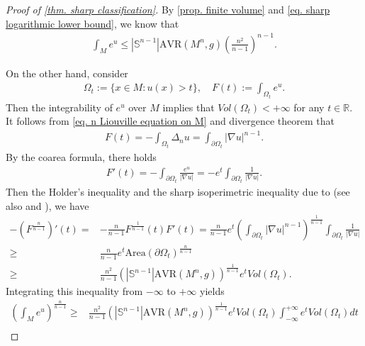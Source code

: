 \documentclass[12pt]{amsart}
\theoremstyle{plain}
\theoremstyle{definition}
\theoremstyle{remark}     %
\begin{document}
\begin{proof}[Proof of \cref{thm. sharp classification}]
    By \cref{prop. finite volume} and  \cref{eq. sharp logarithmic lower bound}, we know that
    \begin{align}\label{eq. upper bound of volume}
        \int_M e^u\leq 
        |\mathbb{S}^{n-1}| \mathrm{AVR}(M^n,g)
        \left(\frac{n^2}{n-1}\right)^{n-1}.
    \end{align}

    On the other hand, consider 
    \begin{align*}
        \Omega_t:=\{x\in M: u(x)>t\},\quad 
        F(t):=\int_{\Omega_t}e^u.
    \end{align*}
    Then the integrability of $e^u$ over $M$ implies that $Vol(\Omega_t)<+\infty$ for any $t\in\mathbb{R}$.
    It follows from \cref{eq. n Liouville equation on M} and divergence theorem that
    \begin{align*}
        F(t)=-\int_{\Omega_t}\Delta_n u
        =\int_{\partial\Omega_t}|\nabla u|^{n-1}.
    \end{align*}
    By the coarea formula, there holds
    \begin{align*}
        F'(t)=-\int_{\partial\Omega_t}
        \frac{e^u}{|\nabla u|}
        =-e^t\int_{\partial\Omega_t}\frac{1}{|\nabla u|}.
    \end{align*}
    Then the Holder's inequality and the sharp isoperimetric inequality due to \cite[Corollary 1.3]{Bre23} (see also \cite[Theorem 1.1]{BK23} and \cite[Theorem 1.1]{Kri24}), we have
    \begin{align*}
        -\left(F^{\frac{n}{n-1}}\right)'(t)
        =&-\frac{n}{n-1}F^{\frac{1}{n-1}}(t)
        F'(t)
        =\frac{n}{n-1}e^t
        \left(\int_{\partial\Omega_t}|\nabla u|^{n-1}\right)^{\frac{1}{n-1}}
        \int_{\partial\Omega_t}\frac{1}{|\nabla u|}\\
        \geq &\frac{n}{n-1}e^t 
        \text{Area}(\partial\Omega_t)^{\frac{n}{n-1}}\\
        \geq& \frac{n^2}{n-1}
        \left(|\mathbb{S}^{n-1}|\mathrm{AVR}(M^n,g)\right)^{\frac{1}{n-1}}e^t
        Vol(\Omega_t).
    \end{align*}
    Integrating this inequality from $-\infty$ to $+\infty$ yields
    \begin{align*}
        \left(\int_M e^u\right)^{\frac{n}{n-1}}
        \geq& \frac{n^2}{n-1}
        \left(|\mathbb{S}^{n-1}|\mathrm{AVR}(M^n,g)\right)^{\frac{1}{n-1}}
        e^t Vol(\Omega_t)
        \int_{-\infty}^{+\infty}e^t Vol(\Omega_t)dt\\

\end{align*}
\end{proof}
\end{document}

